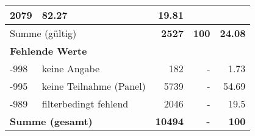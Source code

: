 \begin{longtable}{lXrrr}
       \num{2079} &
       \num[round-mode=places,round-precision=2]{82.27} &
         \num[round-mode=places,round-precision=2]{19.81} \\
     \midrule
     \multicolumn{2}{l}{Summe (gültig)} &
       \textbf{\num{2527}} &
     \textbf{\num{100}} &
       \textbf{\num[round-mode=places,round-precision=2]{24.08}} \\
     \multicolumn{5}{l}{\textbf{Fehlende Werte}}\\
       -998 &
       keine Angabe &
         \num{182} &
        - &
         \num[round-mode=places,round-precision=2]{1.73} \\
       -995 &
       keine Teilnahme (Panel) &
         \num{5739} &
        - &
         \num[round-mode=places,round-precision=2]{54.69} \\
       -989 &
       filterbedingt fehlend &
         \num{2046} &
        - &
         \num[round-mode=places,round-precision=2]{19.5} \\
     \midrule
     \multicolumn{2}{l}{\textbf{Summe (gesamt)}} &
          \textbf{\num{10494}} &
        \textbf{-} &
        \textbf{\num{100}} \\
     \bottomrule
     \end{longtable}
     
